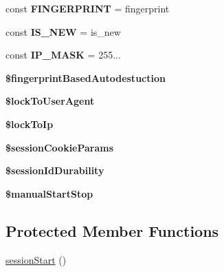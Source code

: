 \begin{DoxyCompactItemize}
const {\bfseries F\+I\+N\+G\+E\+R\+P\+R\+I\+NT} = \textquotesingle{}fingerprint\textquotesingle{}
\item 
\mbox{\label{class_pes_1_1_session_1_1_session_status_handler_ad481b88c81cf2b59145669c5af73e063}} 
const {\bfseries I\+S\+\_\+\+N\+EW} = \textquotesingle{}is\+\_\+new\textquotesingle{}
\item 
\mbox{\label{class_pes_1_1_session_1_1_session_status_handler_a999573eaf9617287277411e52a9229f9}} 
const {\bfseries I\+P\+\_\+\+M\+A\+SK} = \textquotesingle{}255...\textquotesingle{}
\item 
\mbox{\label{class_pes_1_1_session_1_1_session_status_handler_a55ab6df953b8422343db1daab29e1069}} 
{\bfseries \$fingerprint\+Based\+Autodestuction}
\item 
\mbox{\label{class_pes_1_1_session_1_1_session_status_handler_af9f493bfa1902bd6be089e5cb54f46f0}} 
{\bfseries \$lock\+To\+User\+Agent}
\item 
\mbox{\label{class_pes_1_1_session_1_1_session_status_handler_ac40fd92db6e1987994426f569318727e}} 
{\bfseries \$lock\+To\+Ip}
\item 
\mbox{\label{class_pes_1_1_session_1_1_session_status_handler_a90d05497e073a8207b96a52a5bc52f5b}} 
{\bfseries \$session\+Cookie\+Params}
\item 
\mbox{\label{class_pes_1_1_session_1_1_session_status_handler_a6fafdb549cd473937302d62ca2883208}} 
{\bfseries \$session\+Id\+Durability}
\item 
\mbox{\label{class_pes_1_1_session_1_1_session_status_handler_ace5c8f61b1843caccab31801522fb04c}} 
{\bfseries \$manual\+Start\+Stop}
\end{DoxyCompactItemize}
\subsection*{Protected Member Functions}
\begin{DoxyCompactItemize}
\item 
\mbox{\hyperlink{class_pes_1_1_session_1_1_session_status_handler_a3ea6a2c27100f1c8c69a245e16b107e6}{session\+Start}} ()
\end{DoxyCompactItemize}


